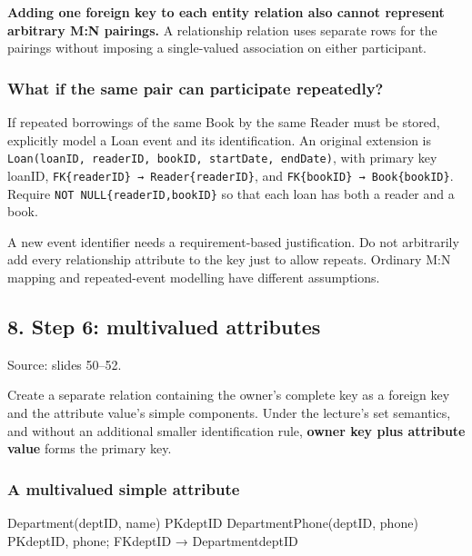\textbf{Adding one foreign key to each entity relation also cannot represent arbitrary M:N pairings.} A relationship relation uses separate rows for the pairings without imposing a single-valued association on either participant.

\subsubsection{What if the same pair can participate repeatedly?}\label{04_er_to_relational_mapping_en-what-if-the-same-pair-can-participate-repeatedly}

If repeated borrowings of the same Book by the same Reader must be stored, explicitly model a Loan event and its identification. An original extension is \texttt{Loan(\allowbreak{}loanID,\allowbreak{}\ readerID,\allowbreak{}\ bookID,\allowbreak{}\ startDate,\allowbreak{}\ endDate)\allowbreak{}}, with primary key loanID, \texttt{FK\{readerID\}\ →\ Reader\{readerID\}}, and \texttt{FK\{bookID\}\ →\ Book\{bookID\}}. Require \texttt{NOT\ NULL\{readerID,bookID\}} so that each loan has both a reader and a book.

A new event identifier needs a requirement-based justification. Do not arbitrarily add every relationship attribute to the key just to allow repeats. Ordinary M:N mapping and repeated-event modelling have different assumptions.

\subsection{8. Step 6: multivalued attributes}\label{04_er_to_relational_mapping_en-step-6-multivalued-attributes}

Source: slides 50--52.

Create a separate relation containing the owner's complete key as a foreign key and the attribute value's simple components. Under the lecture's set semantics, and without an additional smaller identification rule, \textbf{owner key plus attribute value} forms the primary key.

\subsubsection{A multivalued simple attribute}\label{04_er_to_relational_mapping_en-a-multivalued-simple-attribute}

\begin{StudyCode}
Department(deptID, name)                   PK{deptID}
DepartmentPhone(deptID, phone)
  PK{deptID, phone}; FK{deptID} → Department{deptID}
\end{StudyCode}

